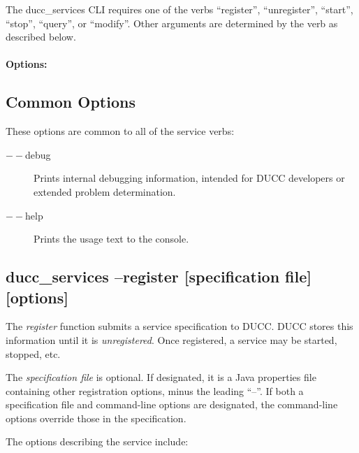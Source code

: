           The ducc\_services CLI requires one of the verbs ``register'', ``unregister'', ``start'', ``stop'', ``query'',
          or ``modify''.  Other arguments are determined by the verb as described below.

    \paragraph{Options:}

    \subsection{Common Options}
        These options are common to all of the service verbs:
        \begin{description}
           \item[$--$debug ]          
             Prints internal debugging information, intended for DUCC developers or extended problem determination.                    
           \item[$--$help]
             Prints the usage text to the console. 
        \end{description}
        
    \subsection{ducc\_services --register [specification file] [options]}
    \label{subsec:cli.ducc-services.register}
       The {\em register} function submits a service specification to DUCC.  DUCC stores this 
       information until it is {\em unregistered}.  Once registered, a service may be
       started, stopped, etc.

       The {\em specification file} is optional.  If designated, it is a Java properties file
       containing other registration options, minus the leading ``--''.  If both a specification
       file and command-line options are designated, the command-line options override those in
       the specification.
                                     
       The options describing the service include:

